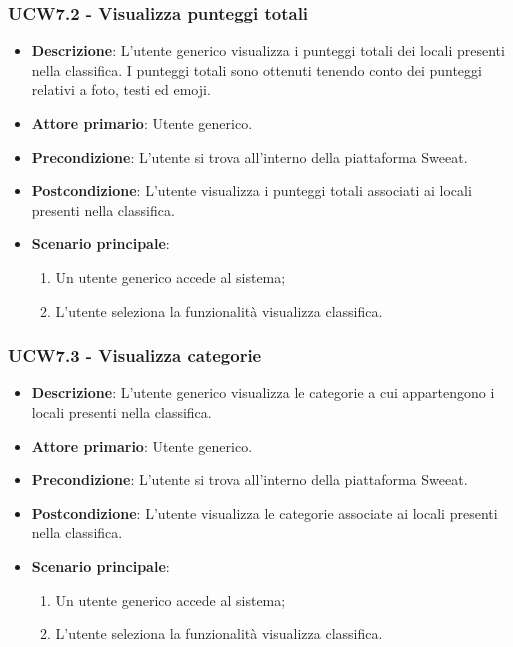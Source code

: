 \subsubsection{UCW7.2 - Visualizza punteggi totali}
\begin{itemize}
	\item \textbf{Descrizione}: L'utente generico visualizza i punteggi totali dei locali presenti nella classifica. I punteggi totali sono ottenuti tenendo conto dei punteggi relativi a foto, testi ed emoji.
    \item \textbf{Attore primario}: Utente generico.
    \item \textbf{Precondizione}: L’utente si trova all’interno della piattaforma Sweeat.
    \item \textbf{Postcondizione}: L’utente visualizza i punteggi totali associati ai locali presenti nella classifica.
    \item \textbf{Scenario principale}: 
    \begin{enumerate}
        \item Un utente generico accede al sistema;
        \item L’utente seleziona la funzionalità visualizza classifica.
    \end{enumerate}
\end{itemize}

\subsubsection{UCW7.3 - Visualizza categorie}
\begin{itemize}
	\item \textbf{Descrizione}: L'utente generico visualizza le categorie a cui appartengono i locali presenti nella classifica.
    \item \textbf{Attore primario}: Utente generico.
    \item \textbf{Precondizione}: L’utente si trova all’interno della piattaforma Sweeat.
    \item \textbf{Postcondizione}: L’utente visualizza le categorie associate ai locali presenti nella classifica.
    \item \textbf{Scenario principale}: 
    \begin{enumerate}
        \item Un utente generico accede al sistema;
        \item L’utente seleziona la funzionalità visualizza classifica.
    \end{enumerate}
\end{itemize}


